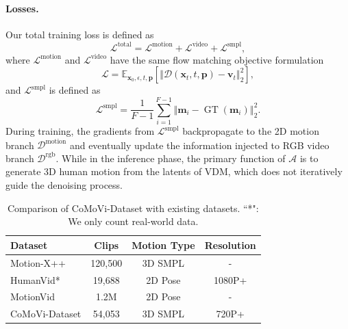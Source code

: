 \vspace{-2mm}
\paragraph{\bf Losses.}
Our total training loss is defined as
\begin{equation}
    \mathcal{L}^{\text{total}} = \mathcal{L}^{\text{motion}} + \mathcal{L}^{\text{video}} + \mathcal{L}^{\text{smpl}},
\end{equation}
where $\mathcal{L}^{\text{motion}}$ and $\mathcal{L}^{\text{video}}$ have the same flow matching objective formulation~\cite{lipman2022flowmatching}
\begin{equation}
    \mathcal{L} = \mathbb{E}_{\bm{x}_0,\epsilon,t,\bm{p}}\left[ \left\Vert \mathcal{D}(\bm{x}_t,t,\bm{p}) - \bm{v}_t \right\Vert_2^2 \right],
\end{equation}
and $\mathcal{L}^{\text{smpl}}$ is defined as
\begin{equation}
    \mathcal{L}^{\text{smpl}} = \frac{1}{F-1}\sum_{i=1}^{F-1}\left\Vert\bm{m}_i-\operatorname{GT}(\bm{m}_i)\right\Vert_2^2.
\end{equation}
During training, the gradients from $\mathcal{L}^{\text{smpl}}$ backpropagate to the 2D motion branch $\mathcal{D}^{\text{motion}}$ and eventually update the information injected to RGB video branch $\mathcal{D}^{\text{rgb}}$. While in the inference phase, the primary function of $\mathcal{A}$ is to generate 3D human motion from the latents of VDM, which does not iteratively guide the denoising process.

\begin{table}[t!]
    \centering
    \scriptsize
    \setlength{\tabcolsep}{22.2pt}
    \begin{tabular}{lccc}
        \toprule
        Dataset & Clips & Motion Type & Resolution\\
        \midrule
        Motion-X++~\cite{lin2023motionx} & 120,500 & 3D SMPL & -\\
        HumanVid*~\cite{wang2024humanvid} & 19,688 & 2D Pose & 1080P+\\
        MotionVid~\cite{wang2025humandreamer} & 1.2M & 2D Pose & -\\
        \cellcolor{lightgray!30}CoMoVi-Dataset & \cellcolor{lightgray!30}54,053 & \cellcolor{lightgray!30}3D SMPL & \cellcolor{lightgray!30}720P+\\
        \bottomrule
    \end{tabular}
    \vspace{2pt}
    \caption{Comparison of CoMoVi-Dataset with existing datasets. ``*": We only count real-world data.}
    \label{tab:dataset}
    \vspace{-20pt}
\end{table}


